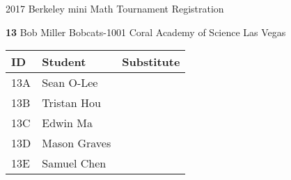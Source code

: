 \documentclass[12pt]{amsart}
\begin{document}
\newpage



\renewcommand{\TeamID}{13}
\renewcommand{\TeamName}{Bob Miller Bobcats-1001}
\renewcommand{\SchoolName}{Coral Academy of Science Las Vegas}
\renewcommand{\IDA}{13A}
\renewcommand{\IDB}{13B}
\renewcommand{\IDC}{13C}
\renewcommand{\IDD}{13D}
\renewcommand{\IDE}{13E}
\renewcommand{\StudentA}{Sean O-Lee}
\renewcommand{\StudentB}{Tristan Hou}
\renewcommand{\StudentC}{Edwin Ma}
\renewcommand{\StudentD}{Mason Graves}
\renewcommand{\StudentE}{Samuel Chen}

\begin{center}
{\sc \Large 2017 Berkeley mini Math Tournament Registration}

\bigskip
\bigskip

{\bf \Large  \TeamID} \hfill {\large \TeamName} \hfill {\large \SchoolName}

\bigskip
\bigskip

\begin{tabular}{| p{} | p{} | p{} |}
\hline
\bf ID         & \bf Student             & \bf Substitute             \\ \hline
\IDA           & \StudentA               &                            \\ \hline
\IDB           & \StudentB               &                            \\ \hline
\IDC           & \StudentC               &                            \\ \hline
\IDD           & \StudentD               &                            \\ \hline
\IDE           & \StudentE               &                            \\ \hline
\end{tabular} 
\end{center}
\bigskip
\bigskip

\newpage



\renewcommand{\TeamID}{14}
\renewcommand{\TeamName}{Coral Falcons-1001}
\renewcommand{\SchoolName}{Coral Academy of Science Las Vegas}
\renewcommand{\IDA}{14A}
\renewcommand{\IDB}{14B}
\renewcommand{\IDC}{14C}
\renewcommand{\IDD}{14D}
\renewcommand{\IDE}{14E}
\renewcommand{\StudentA}{Elizabeth Ha}
\renewcommand{\StudentB}{Michael Ha}
\renewcommand{\StudentC}{Mateo Sciscento}
\renewcommand{\StudentD}{Timothy Lim}
\renewcommand{\StudentE}{Josephine Hartl}
\end{document}

